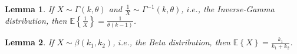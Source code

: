 \documentclass[journal,12pt,onecolumn]{IEEEtran}
\newtheorem{lemma}{Lemma}
\begin{document}
\begin{lemma} If $X \sim \Gamma(k,\theta)$ and $\frac{1}{X} \sim \Gamma^{-1}(k,\theta)$, $i.e.$, the Inverse-Gamma distribution, then $\mathbb{E} \left\lbrace \frac{1}{X} \right\rbrace = \frac{1}{\theta(k-1)}$.
\end{lemma}



\begin{lemma} If $X \sim \beta(k_1,k_2)$, $i.e.$, the Beta distribution, then $\mathbb{E}  \left\lbrace X \right\rbrace  = \frac{k_1}{k_1 + k_2}$.
\end{lemma}
\end{document}
